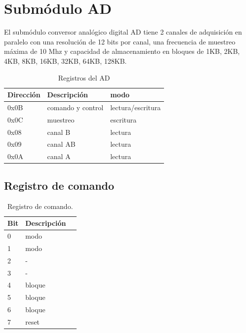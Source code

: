 \section{Subm\'odulo AD}

El subm\'odulo conversor anal\'ogico digital AD tiene 2 canales de adquisici\'on en paralelo
con una resoluci\'on de 12 bits por canal, una frecuencia de muestreo m\'axima de 10 Mhz 
y capacidad de almacenamiento en bloques de 1KB, 2KB, 4KB, 8KB, 16KB, 32KB, 64KB, 128KB.

\begin{table}[ht]
    \centering
    \begin{tabular}{|l|l|l|}
    \hline
     Direcci\'on   & Descripci\'on   & modo\\
    \hline
     0x0B        & comando y control & lectura/escritura\\ 
    \hline
     0x0C        & muestreo          & escritura\\
     \hline
     0x08        & canal B           &lectura   \\
     \hline
     0x09        & canal AB          &lectura   \\
     \hline
     0x0A        & canal A           &lectura   \\
     \hline
\end{tabular}
\caption{\label{tab:registros_ad} Registros del AD}
\end{table}

\subsection{Registro de comando}
\begin{table}[ht]
    \centering
    \begin{tabular}{|l|l|l|}
    \hline
    Bit    & Descripci\'on \\
    \hline
     0 & modo\\ 
    \hline
     1 & modo\\
     \hline
     2 & - \\
     \hline
     3 & - \\
     \hline
     4 & bloque \\
     \hline
     5 & bloque \\
     \hline
     6 & bloque \\
     \hline
     7 & reset \\
     \hline
\end{tabular}
\caption{\label{tab:registros_ad_cmd}Registro de comando.}
\end{table}

